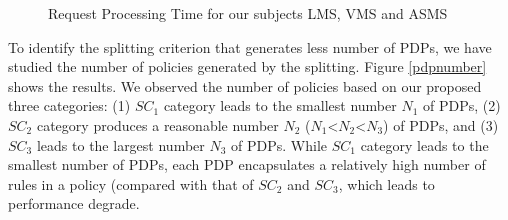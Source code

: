  \begin{figure}[h!]
  \centering
  \caption{Request Processing Time for our subjects LMS, VMS and ASMS}
  \label{fig:processing time}
\end{figure}
 

To identify the splitting criterion that generates less number of PDPs, we have studied the number of policies generated by the
 splitting. Figure \ref{pdpnumber} shows the results.
We observed the number of policies based on our proposed three categories: (1) $SC_{1}$ category leads to the smallest number $N_1$ of PDPs, 
(2) $SC_{2}$ category produces a reasonable number
 $N_2$ ($N_1$<$N_2$<$N_3$) of PDPs, and (3) $SC_{3}$ leads to the largest number $N_3$ of PDPs.
While $SC_{1}$ category leads to the smallest number of PDPs, each PDP encapsulates a relatively high number of rules in a policy (compared
with that of $SC_{2}$ and $SC_{3}$, which leads to performance degrade. 

